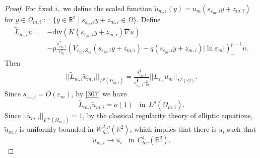 \documentclass[10pt,a4paper]{amsart}
\begin{document}
\begin{proof}
For fixed $ i, $ we define the scaled function $ \tilde{u}_{m,i}(y)=u_m(s_{\varepsilon_m, i}y+z_{m,i}) $ for $ y\in \Omega_{m,i}:=\{y\in\mathbb{R}^2\mid s_{\varepsilon_m, i}y+z_{m,i}\in \Omega\} $.
Define
\begin{equation*}
\begin{split}
\tilde{L}_{m,i}u=&-\text{div}\left (K(s_{\varepsilon_m, i}y+z_{m,i})\nabla u\right )\\
&-p\frac{s_{\varepsilon_m,i}^2}{\varepsilon_m^2}\left (V_{\varepsilon_m, Z_m}(s_{\varepsilon_m, i}y+z_{m,i})-q(s_{\varepsilon_m, i}y+z_{m,i})|\ln\varepsilon_m|\right )^{p-1}_+ u.
\end{split}
\end{equation*}
Then
\begin{equation*}
\begin{split}
||\tilde{L}_{m,i}\tilde{u}_{m,i}||_{L^p(\Omega_{m,i})}
=\frac{s_{\varepsilon_m, i}^2}{s_{\varepsilon_m, i}^{\frac{2}{p}}\varepsilon_m^2}||L_{\varepsilon_m}u_m||_{L^p(\Omega)}.
\end{split}
\end{equation*}
Since  $ s_{\varepsilon_m, i}=O(\varepsilon_m) $, by \eqref{307} we have
\begin{equation*}
\tilde{L}_{m,i}\tilde{u}_{m,i}=o(1)\ \ \ \  \text{in}\ \ L^p(\Omega_{m,i}).
\end{equation*}
Since $ ||\tilde{u}_{m,i}||_{L^\infty(\Omega_{m,i})}=1 $, by the classical regularity theory of  elliptic equations, $ \tilde{u}_{m,i} $ is uniformly bounded in $ W^{2,p}_{loc}(\mathbb{R}^2) $, which implies that there is $u_i$ such that
\begin{equation*}
\tilde{u}_{m,i}\to u_i\ \ \ \ \text{in}\ \ C^1_{loc}(\mathbb{R}^2).
\end{equation*}


\end{proof}
\end{document}
